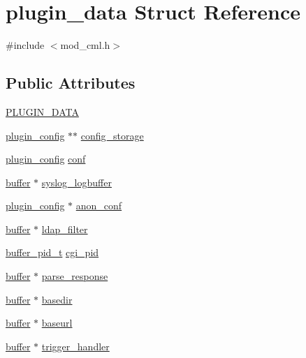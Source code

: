 \hypertarget{structplugin__data}{\section{plugin\-\_\-data Struct Reference}
\label{structplugin__data}
}


{\ttfamily \#include $<$mod\-\_\-cml.\-h$>$}

\subsection*{Public Attributes}
\begin{DoxyCompactItemize}
\item 
\hyperlink{structplugin__data_ae238c7cbb55dc027fedaf363fff6d03a}{P\-L\-U\-G\-I\-N\-\_\-\-D\-A\-T\-A}
\item 
\hyperlink{structplugin__config}{plugin\-\_\-config} $\ast$$\ast$ \hyperlink{structplugin__data_af26449c8e3dccfa1d98834dd1e0dad9a}{config\-\_\-storage}
\item 
\hyperlink{structplugin__config}{plugin\-\_\-config} \hyperlink{structplugin__data_a9e7cfafb083a07a6d623833a33c6a1dc}{conf}
\item 
\hyperlink{structbuffer}{buffer} $\ast$ \hyperlink{structplugin__data_a0ac2c3c2828f52d293c559d0ce072e86}{syslog\-\_\-logbuffer}
\item 
\hyperlink{structplugin__config}{plugin\-\_\-config} $\ast$ \hyperlink{structplugin__data_a2fd67b6a3f9a6dda4ba3033de23f2fde}{anon\-\_\-conf}
\item 
\hyperlink{structbuffer}{buffer} $\ast$ \hyperlink{structplugin__data_a062abf92bbdff596dc8fbe59b05a3590}{ldap\-\_\-filter}
\item 
\hyperlink{structbuffer__pid__t}{buffer\-\_\-pid\-\_\-t} \hyperlink{structplugin__data_aeecb5b6d680f1564981751d6908dd8c8}{cgi\-\_\-pid}
\item 
\hyperlink{structbuffer}{buffer} $\ast$ \hyperlink{structplugin__data_aa8da61e6943d73483d763d33779fea0c}{parse\-\_\-response}
\item 
\hyperlink{structbuffer}{buffer} $\ast$ \hyperlink{structplugin__data_a62fb99b4e8e39a7527d4f11bc884a569}{basedir}
\item 
\hyperlink{structbuffer}{buffer} $\ast$ \hyperlink{structplugin__data_a694a4f05a34acf406676f4c14773181b}{baseurl}
\item 
\hyperlink{structbuffer}{buffer} $\ast$ \hyperlink{structplugin__data_a2fa181fa93fbda4c0e6aff9e434cc8d3}{trigger\-\_\-handler}
\item 
$$
\end{DoxyCompactItemize}
